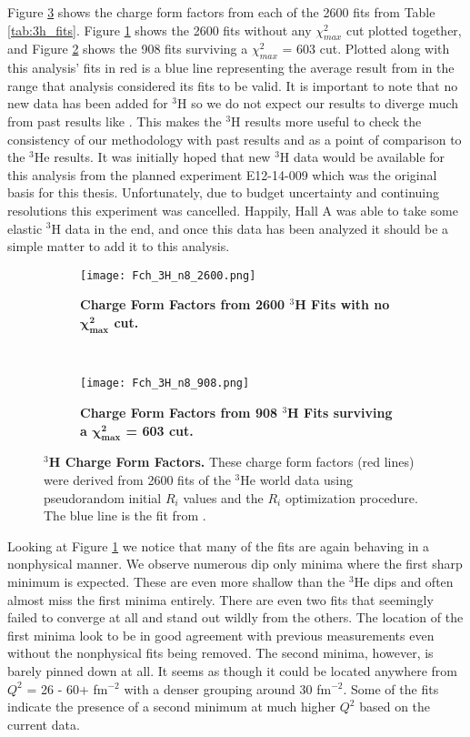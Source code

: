 Figure \ref{fig:3h_fch} shows the charge form factors from each of the 2600 fits from Table \ref{tab:3h_fits}. Figure \ref{fig:3h_fch_no_cut} shows the 2600 fits without any $\chi^2_{max}$ cut plotted together, and Figure \ref{fig:3h_fch_cut} shows the 908 fits surviving a $\chi^2_{max}$ = 603 cut. Plotted along with this analysis' fits in red is a blue line representing the average result from \cite{Article:Amroun} in the range that analysis considered its fits to be valid. It is important to note that no new data has been added for $^3$H so we do not expect our results to diverge much from past results like \cite{Article:Amroun}. This makes the $^3$H results more useful to check the consistency of our methodology with past results and as a point of comparison to the $^3$He results. It was initially hoped that new $^3$H data would be available for this analysis from the planned experiment E12-14-009 \cite{3h_proposal} which was the original basis for this thesis. Unfortunately, due to budget uncertainty and continuing resolutions this experiment was cancelled. Happily, Hall A was able to take some elastic $^3$H data in the end, and once this data has been analyzed it should be a simple matter to add it to this analysis.

\begin{figure}[!ht]
\begin{subfigure}{1.\textwidth}
  \centering
  \texttt{[image: Fch\_3H\_n8\_2600.png]}
  \caption{\bf{Charge Form Factors from 2600 $^3$H Fits with no $\boldsymbol{\chi^2_{max}}$ cut.}}
  \label{fig:3h_fch_no_cut}
\end{subfigure}\\
\begin{subfigure}{1.\textwidth}
  \centering
  \texttt{[image: Fch\_3H\_n8\_908.png]}
  \caption{\bf{Charge Form Factors from 908 $^3$H Fits surviving a $\boldsymbol{\chi^2_{max}}$ = 603 cut.}}
  \label{fig:3h_fch_cut}
\end{subfigure}
\caption[$^3$H Charge Form Factors] {
{\bf{$^3$H Charge Form Factors.}} These charge form factors (red lines) were derived from 2600 fits of the $^3$He world data using pseudorandom initial $R_i$ values and the $R_i$ optimization procedure. The blue line is the fit from \cite{Article:Amroun}.}
\label{fig:3h_fch}
\end{figure}

Looking at Figure \ref{fig:3h_fch_no_cut} we notice that many of the fits are again behaving in a nonphysical manner. We observe numerous dip only minima where the first sharp minimum is expected. These are even more shallow than the $^3$He dips and often almost miss the first minima entirely. There are even two fits that seemingly failed to converge at all and stand out wildly from the others. The location of the first minima look to be in good agreement with previous measurements even without the nonphysical fits being removed. The second minima, however, is barely pinned down at all. It seems as though it could be located anywhere from $Q^2$ = 26 - 60+ fm$^{-2}$ with a denser grouping around 30 fm$^{-2}$. Some of the fits indicate the presence of a second minimum at much higher $Q^2$ based on the current data. 

